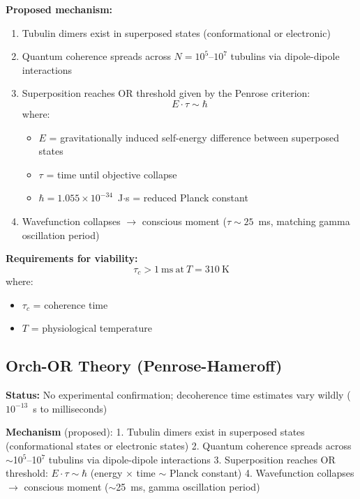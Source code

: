 \textbf{Proposed mechanism:}
\begin{enumerate}
\item Tubulin dimers exist in superposed states (conformational or electronic)
\item Quantum coherence spreads across $N = 10^5$--$10^7$ tubulins via dipole-dipole interactions
\item Superposition reaches OR threshold given by the Penrose criterion:
\begin{equation}
E \cdot \tau \sim \hbar
\end{equation}
where:
\begin{itemize}
\item $E$ = gravitationally induced self-energy difference between superposed states
\item $\tau$ = time until objective collapse
\item $\hbar = 1.055 \times 10^{-34}$~J$\cdot$s = reduced Planck constant
\end{itemize}
\item Wavefunction collapses $\rightarrow$ conscious moment ($\tau \sim 25$~ms, matching gamma oscillation period)
\end{enumerate}

\textbf{Requirements for viability:}
\begin{equation}
\tau_c > 1\ \mathrm{ms}\ \text{at}\ T = 310\ \mathrm{K}
\end{equation}
where:
\begin{itemize}
\item $\tau_c$ = coherence time
\item $T$ = physiological temperature
\end{itemize}

\subsection{Orch-OR Theory
(Penrose-Hameroff)}\label{orch-or-theory-penrose-hameroff}

\textbf{Status:} No experimental confirmation; decoherence time estimates vary wildly ($10^{-13}$~s to milliseconds)

\textbf{Mechanism} (proposed): 1. Tubulin dimers exist in superposed
states (conformational states or electronic states) 2. Quantum coherence
spreads across $\sim$10$^5$--10$^7$ tubulins via dipole-dipole interactions 3. Superposition reaches OR threshold: \(E \cdot \tau \sim \hbar\) (energy $\times$ time $\sim$ Planck constant) 4. Wavefunction collapses $\rightarrow$ conscious moment ($\sim$25~ms, gamma oscillation period)

